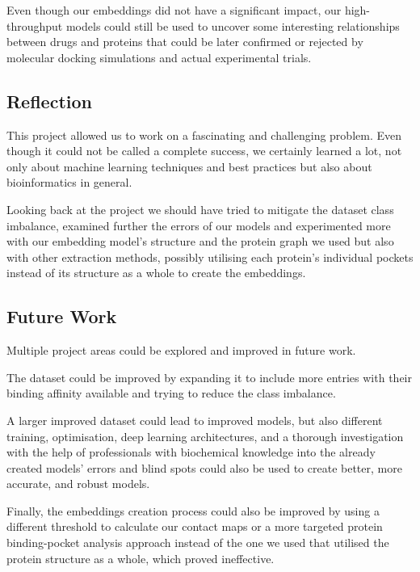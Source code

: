Even though our embeddings did not have a significant impact, our high-throughput models could still be used to uncover some interesting relationships between drugs and proteins that could be later confirmed or rejected by molecular docking simulations and actual experimental trials.

\subsection{Reflection}

This project allowed us to work on a fascinating and challenging problem. Even though it could not be called a complete success, we certainly learned a lot, not only about machine learning techniques and best practices but also about bioinformatics in general.

Looking back at the project we should have tried to mitigate the dataset class imbalance, examined further the errors of our models and experimented more with our embedding model's structure and the protein graph we used but also with other extraction methods, possibly utilising each protein's individual pockets instead of its structure as a whole to create the embeddings. 

\bigskip
\bigskip
\bigskip

\subsection{Future Work}

Multiple project areas could be explored and improved in future work.

The dataset could be improved by expanding it to include more entries with their binding affinity available and trying to reduce the class imbalance. 

A larger improved dataset could lead to improved models, but also different training, optimisation, deep learning architectures, and a thorough investigation with the help of professionals with biochemical knowledge into the already created models' errors and blind spots could also be used to create better, more accurate, and robust models.

Finally, the embeddings creation process could also be improved by using a different threshold to calculate our contact maps or a more targeted protein binding-pocket analysis approach instead of the one we used that utilised the protein structure as a whole, which proved ineffective.
